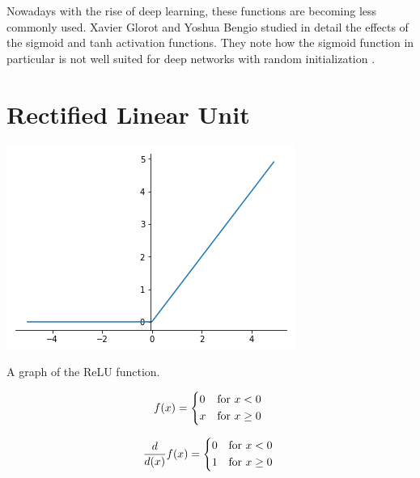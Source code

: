 Nowadays with the rise of deep learning, these functions are becoming less commonly used. Xavier Glorot and Yoshua Bengio studied in detail the effects of the sigmoid and tanh activation functions. They note how the sigmoid function in particular is not well suited for deep networks with random initialization \citep{glorot2010understanding}.

\section{Rectified Linear Unit}\label{sec:relu}
\begin{marginfigure}
  \includegraphics{graphics/activation_functions/relu_function.png}
  \label{fig:relufunction}
  \caption{
    A graph of the ReLU function.
  }
\end{marginfigure}

\begin{equation}\label{relufunction}
    f(x) =
      \begin{dcases*}
                                       0 & \text{for $x < 0$} \\
                                       x & \text{for $x \geq 0$} \\
      \end{dcases*}
\end{equation}

\begin{equation}\label{relufunctionderivative}
    \frac{d}{d(x)}f(x) =
      \begin{dcases*}
                                       0 & \text{for $x < 0$} \\
                                       1 & \text{for $x \geq 0$} \\
      \end{dcases*}
\end{equation}

